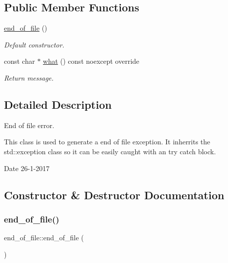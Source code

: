 \subsection*{Public Member Functions}
\begin{DoxyCompactItemize}
\item 
\hyperlink{classend__of__file_a4e87a15d753f94fad00deee27aa4dc02}{end\+\_\+of\+\_\+file} ()
\begin{DoxyCompactList}\small\item\em Default constructor. \end{DoxyCompactList}\item 
const char $\ast$ \hyperlink{classend__of__file_a32e8c4c2f39a8484c2f39f9a98d5dfb8}{what} () const noexcept override
\begin{DoxyCompactList}\small\item\em Return message. \end{DoxyCompactList}\end{DoxyCompactItemize}


\subsection{Detailed Description}
End of file error. 

This class is used to generate a end of file exception. It inherrits the std\+::exception class so it can be easily caught with an try catch block.

\begin{DoxyDate}{Date}
26-\/1-\/2017 
\end{DoxyDate}


\subsection{Constructor \& Destructor Documentation}
\mbox{\label{classend__of__file_a4e87a15d753f94fad00deee27aa4dc02}} 
\subsubsection{\texorpdfstring{end\+\_\+of\+\_\+file()}{end\_of\_file()}}
{\footnotesize\ttfamily end\+\_\+of\+\_\+file\+::end\+\_\+of\+\_\+file (\begin{DoxyParamCaption}{ }\end{DoxyParamCaption})\hspace{0.3cm}{\ttfamily [inline]}}



